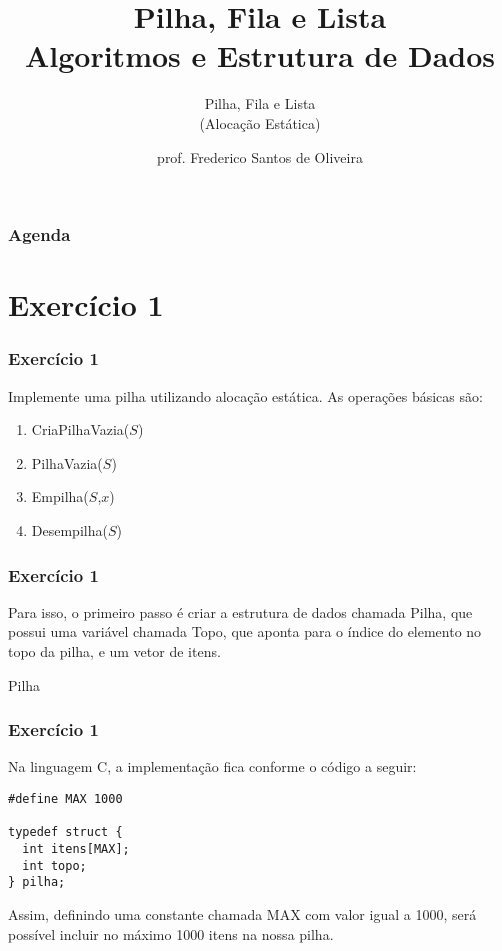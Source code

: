 \documentclass[aspectratio=169]{beamer}
\title[Aula Prática Pilha, Fila e Lista]{Pilha, Fila e Lista\\
   Algoritmos e Estrutura de Dados}
\subtitle{Pilha, Fila e Lista\\(Alocação Estática)}
\author[Frederico Santos de Oliveira]{prof. Frederico Santos de Oliveira}
\institute[UFMT]{Universidade Federal de Mato Grosso\\ Instituto de Engenharia}
\date{}
\begin{document}
\begin{frame}[plain]
  \titlepage
\end{frame}


\begin{frame}
  \frametitle{Agenda}
  \tableofcontents
\end{frame}

\section{Exercício 1}

\begin{frame}
\frametitle{Exercício 1}
Implemente uma pilha utilizando alocação estática. As operações básicas são:
\begin{enumerate}
 \item CriaPilhaVazia($S$) 
 \item PilhaVazia($S$)
 \item Empilha($S$,$x$)
 \item Desempilha($S$) 
\end{enumerate}
\end{frame}


\begin{frame}[fragile]
\frametitle{Exercício 1}
Para isso, o primeiro passo é criar a estrutura de dados chamada Pilha, que possui uma variável chamada Topo, que aponta para o índice do elemento no topo da pilha, e um vetor de itens.
\begin{algorithm}[H]
\caption{Pilha} 
\label{Nodo}
\end{algorithm} 
\end{frame}


\begin{frame}[fragile]
\frametitle{Exercício 1}
Na linguagem C, a implementação fica conforme o código a seguir:
\begin{lstlisting}[style=CStyle]
#define MAX 1000

typedef struct {
  int itens[MAX];
  int topo;
} pilha;
\end{lstlisting}  
Assim, definindo uma constante chamada MAX com valor igual a 1000, será possível incluir no máximo 1000 itens na nossa pilha.
\end{frame}
\end{document}
